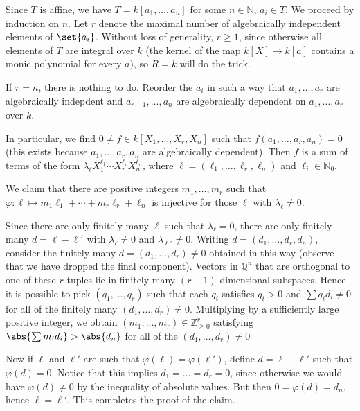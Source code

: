 Since $T$ is affine, we have $T = k[a_1, \ldots, a_n]$ for some $n \in \mathbb{N}$,
$a_i \in T$. We proceed by induction on $n$. Let $r$ denote the maximal number
of algebraically independent elements of $\set{a_i}$. Without loss of generality, $r\geq 1$,
since otherwise all elements of $T$ are integral over $k$ (the kernel of the map
$k[X] \to k[a]$ contains a monic polynomial for every $a)$, so $R = k$ will do the
trick.

If $r = n$, there is nothing to do.
Reorder the $a_i$  in such a way that
$a_1, \ldots, a_r$ are algebraically indepdent
and $a_{r+1}, \ldots, a_n$ are algebraically dependent on $a_1, \ldots, a_r$ over
$k$.

In particular, we find $0\neq f \in k[X_1, \ldots, X_r, X_n]$ such that
$f(a_1, \ldots, a_r, a_n)= 0$ (this exists because $a_1, \ldots, a_r, a_n$ are
algebraically dependent). Then $f$ is a sum of terms of the form
$\lambda_\ell X_1^{\ell_1}\cdots X_r^{\ell_r}X_n^{\ell_n}$, where
$\ell = (\ell_1, \ldots, \ell_r, \ell_n)$ and $\ell_i \in \mathbb{N}_0$.

We claim that there are positive integers $m_1, \ldots, m_r$  such that
$\varphi\colon \ell\mapsto m_1\ell_1 + \cdots + m_r\ell_r + \ell_n$ is injective
for those $\ell$ with $\lambda_\ell \neq 0$.

Since there are only finitely many $\ell$ such that $\lambda_\ell = 0$, there
are only finitely many $d = \ell - \ell'$ with $\lambda_\ell \neq 0$ and
$\lambda_{\ell'}\neq 0$. Writing $d = (d_1, \ldots, d_r, d_n)$, consider the
finitely many $d = (d_1, \ldots, d_r)\neq 0$ obtained in this way (observe that
we have dropped the final component).
Vectors in $\mathbb{Q}^n$
that are orthogonal to one of these $r$-tuples lie in finitely many $(r-1)$-dimensional
subspaces. Hence it is possible to pick $(q_1, \ldots, q_r)$ such that each
$q_i$ satisfies $q_i > 0$ and $\sum q_id_i\neq 0$ for all of the finitely many
$(d_1, \ldots, d_r)\neq 0$. Multiplying by a sufficiently large positive integer,
we obtain
$(m_1, \ldots, m_r) \in \mathbb{Z}_{\geq 0}^r$ satisfying
$\abs{\sum m_id_i} > \abs{d_n}$ for all of the $(d_1, \ldots, d_r) \neq 0$

Now if  $\ell$ and $\ell'$ are such that $\varphi(\ell) = \varphi(\ell')$, define
$d = \ell - \ell'$ such that $\varphi(d) = 0$. Notice that this implies
$d_1 = \ldots = d_r = 0$, since otherwise we would have $\varphi(d) \neq 0$ by
the inequality of absolute values. But then $0 = \varphi(d) = d_n$, hence
$\ell = \ell'$. This completes the proof of the claim.

